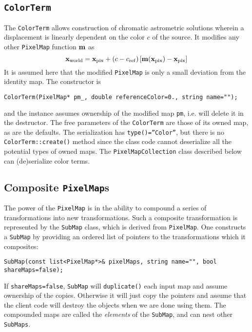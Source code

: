 \documentclass[11pt,preprint,flushrt]{aastex}
\newcommand{\vx}{\mbox{\bf x}}
\begin{document}
\subsection{\texttt{ColorTerm}}
The \texttt{ColorTerm} allows construction of chromatic astrometric solutions wherein a displacement is linearly dependent on the color $c$ of the source.  It modifies any other \texttt{PixelMap} function ${\bf m}$ as
\begin{equation}
\vx_{\rm world}= \vx_{\rm pix} + \left(c-c_{\rm
    ref}\right)\left[{\bf m}(\vx_{\rm pix})-\vx_{\rm pix}\right]
\end{equation}
It is assumed here that the modified \texttt{PixelMap} is only a small deviation from the identity map.  The constructor is
\begin{verbatim}
ColorTerm(PixelMap* pm_, double referenceColor=0., string name="");
\end{verbatim}
and the instance assumes ownership of the modified map \texttt{pm}, i.e. will delete it in the destructor.  The free parameters of the \texttt{ColorTerm} are those of its owned map, as are the defaults.  The serialization has \texttt{type()=''Color''}, but there is no \texttt{ColorTerm::create()} method since the class code cannot deserialize all the potential types of owned maps.  The \texttt{PixelMapCollection} class described below can (de)serialize color terms.

\subsection{Composite {\tt PixelMap}s}
The power of the \texttt{PixelMap} is in the ability to compound a series of transformations into new transformations.  Such a composite transformation is represented by the \texttt{SubMap} class, which is derived from \texttt{PixelMap}.  One constructs a \texttt{SubMap} by providing an ordered list of pointers to the transformations which it composites:
\begin{verbatim}
SubMap(const list<PixelMap*>& pixelMaps, string name="", bool shareMaps=false); 
\end{verbatim}    
If \texttt{shareMaps=false}, \texttt{SubMap} will \texttt{duplicate()} each input map and assume ownership of the copies.  Otherwise it will just copy the pointers and assume that the client code will destroy the objects when we are done using them.  The compounded maps are called the \emph{elements} of the \texttt{SubMap}, and can nest other \texttt{SubMaps}.
\end{document}
